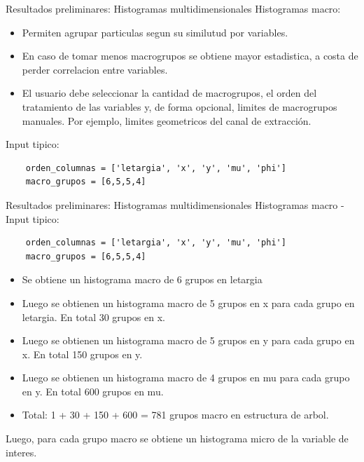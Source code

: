 \documentclass[aspectratio=169,english]{beamer}
\begin{document}
\begin{frame}[fragile]{Resultados preliminares: Histogramas multidimensionales}
    Histogramas macro:
    \begin{itemize}
        \item Permiten agrupar particulas segun su similutud por variables.
        \item En caso de tomar menos macrogrupos se obtiene mayor estadistica, a costa de perder correlacion entre variables.
        \item El usuario debe seleccionar la cantidad de macrogrupos, el orden del tratamiento de las variables y, de forma opcional, limites de macrogrupos manuales. Por ejemplo, limites geometricos del canal de extracción. 
    \end{itemize} 

    Input tipico:

    \begin{verbatim}
    orden_columnas = ['letargia', 'x', 'y', 'mu', 'phi']
    macro_grupos = [6,5,5,4]
    \end{verbatim}

\end{frame}

\begin{frame}[fragile]{Resultados preliminares: Histogramas multidimensionales}
    Histogramas macro - Input tipico:

    \begin{verbatim}
    orden_columnas = ['letargia', 'x', 'y', 'mu', 'phi']
    macro_grupos = [6,5,5,4]
    \end{verbatim}

    \begin{itemize}
        \item Se obtiene un histograma macro de 6 grupos en letargia
        \item Luego se obtienen un histograma macro de 5 grupos en x para cada grupo en letargia. En total 30 grupos en x.
        \item Luego se obtienen un histograma macro de 5 grupos en y para cada grupo en x. En total 150 grupos en y.
        \item Luego se obtienen un histograma macro de 4 grupos en mu para cada grupo en y. En total 600 grupos en mu.
        \item Total: 1 + 30 + 150 + 600 = 781 grupos macro en estructura de arbol.
    \end{itemize}

    Luego, para cada grupo macro se obtiene un histograma micro de la variable de interes. 

\end{frame}
\end{document}
